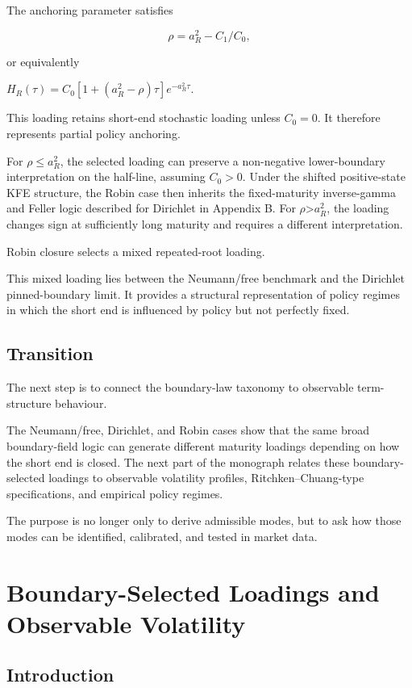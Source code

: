\documentclass[11pt,oneside]{book}
\begin{document}
The anchoring parameter satisfies

\[
\rho = a_R^2 - C_1/C_0,
\]

or equivalently

$H_R(\tau)=C_0[1+(a_R^2-\rho)\tau]e^{-a_R^2\tau}$.

This loading retains short-end stochastic loading unless $C_0=0$. It
therefore represents partial policy anchoring.

For $\rho\leq a_R^2$, the selected loading can preserve a non-negative
lower-boundary interpretation on the half-line, assuming
$C_0>0$. Under the shifted positive-state KFE structure, the
Robin case then inherits the fixed-maturity inverse-gamma and Feller
logic described for Dirichlet in Appendix B. For $\rho$\textgreater $a_R^2$,
the loading changes sign at sufficiently long maturity and requires a
different interpretation.

Robin closure selects a mixed repeated-root loading.

This mixed loading lies between the Neumann/free benchmark and the
Dirichlet pinned-boundary limit. It provides a structural representation
of policy regimes in which the short end is influenced by policy but not
perfectly fixed.

\section{Transition}\label{transition}

The next step is to connect the boundary-law taxonomy to observable
term-structure behaviour.

The Neumann/free, Dirichlet, and Robin cases show that the same broad
boundary-field logic can generate different maturity loadings depending
on how the short end is closed. The next part of the monograph relates
these boundary-selected loadings to observable volatility profiles,
Ritchken--Chuang-type specifications, and empirical policy regimes.

The purpose is no longer only to derive admissible modes, but to ask how
those modes can be identified, calibrated, and tested in market data.

\chapter{Boundary-Selected Loadings and Observable Volatility}\label{chapter-10}

\section{Introduction}\label{introduction-7}
\end{document}
